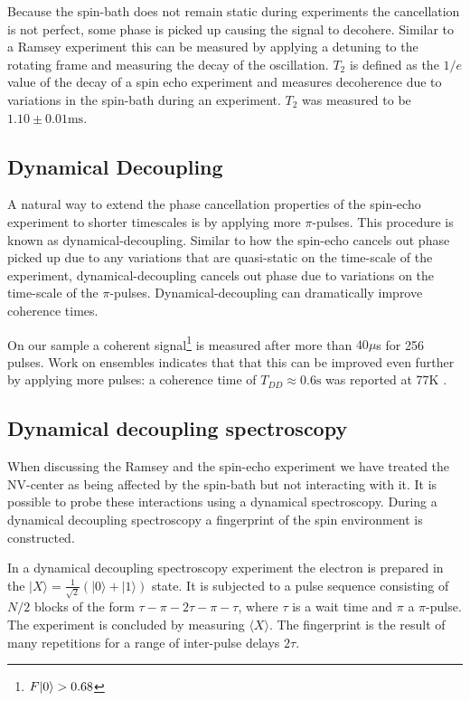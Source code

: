 Because the spin-bath does not remain static during experiments the cancellation is not perfect, some phase is picked up causing the signal to decohere.
Similar to a Ramsey experiment this can be measured by applying a detuning to the rotating frame and measuring the decay of the oscillation.
$T_2$ is defined as the $1/e$ value of the decay of a spin echo experiment and measures decoherence due to variations in the spin-bath during an experiment.
$T_2$ was measured to be $1.10 \pm 0.01 \mathrm{ms}$.

\subsection{Dynamical Decoupling}
A natural way to extend the phase cancellation properties of the spin-echo experiment to shorter timescales is by applying more $\pi$-pulses.
This procedure is known as dynamical-decoupling.
Similar to how the spin-echo cancels out phase picked up due to any variations that are quasi-static on the time-scale of the experiment, dynamical-decoupling cancels out phase due to variations on the time-scale of the $\pi$-pulses.
Dynamical-decoupling can dramatically improve coherence times\citep{Lange2010Universal}.

On our sample a coherent signal\footnote{$F{\left\vert{0}\right\rangle} > 0.68$} is measured after more than $40 \mu$s for 256 pulses.
Work on ensembles indicates that that this can be improved even further by applying more pulses: a coherence time of $T_{DD} \approx 0.6 \mathrm{s}$ was reported at 77K \citep{Gill2013SolidState}.

\subsection{Dynamical decoupling spectroscopy}

When discussing the Ramsey and the spin-echo experiment we have treated the NV-center as being affected by the spin-bath but not interacting with it.
It is possible to probe these interactions using a dynamical spectroscopy.
During a dynamical decoupling spectroscopy a fingerprint of the spin environment is constructed.

In a dynamical decoupling spectroscopy experiment the electron is prepared in the $|X\rangle =\tfrac{1}{\sqrt{2}}\left( |0\rangle +|1\rangle \right) $ state.
It is subjected to a pulse sequence consisting of $N/2$ blocks of the form {$\tau - \pi -2\tau-\pi-\tau$}, where $\tau$ is a wait time and $\pi$ a $\pi$-pulse.
The experiment is concluded by measuring $\langle X\rangle $.
The fingerprint is the result of many repetitions for a range of inter-pulse delays $2\tau$.


